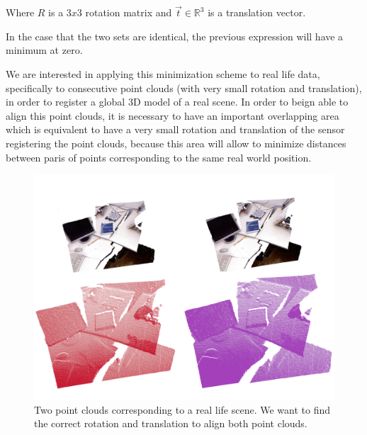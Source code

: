 Where $R$ is a  $3x3$ rotation matrix and $\vec{t} \in \mathbb{R}^3$ is a translation vector.


In the case that the two sets are identical, the previous expression will have a minimum at zero.

We are interested in applying this minimization scheme to real life data, specifically to consecutive 
point clouds (with very small rotation and translation), in order to register a global 3D model of 
a real scene. In order to beign able to align this point clouds, it is necessary to have an important overlapping 
area which is equivalent to have a very small rotation and translation of the sensor registering the point clouds, 
because this area will allow to minimize distances between paris of points corresponding to the same real world position.


\begin{figure}[!h]
\begin{center}
\includegraphics[scale=0.35]{images/two_clouds}
\caption{Two point clouds corresponding to a real life scene. We want to find the correct rotation and translation to align both point clouds.}
\end{center}
\end{figure}

